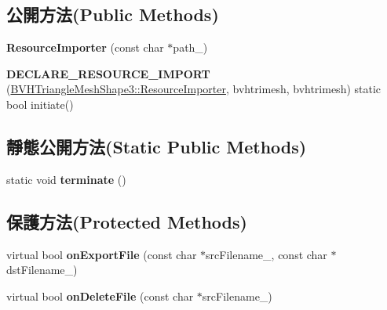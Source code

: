 \subsection*{公開方法(Public Methods)}
\begin{DoxyCompactItemize}
\item 
{\bfseries Resource\+Importer} (const char $\ast$path\+\_\+)\hypertarget{class_magnum_1_1_b_v_h_triangle_mesh_shape3_1_1_resource_importer_a3ae29654117886906c28c8e8b51dbdd3}{}\label{class_magnum_1_1_b_v_h_triangle_mesh_shape3_1_1_resource_importer_a3ae29654117886906c28c8e8b51dbdd3}

\item 
{\bfseries D\+E\+C\+L\+A\+R\+E\+\_\+\+R\+E\+S\+O\+U\+R\+C\+E\+\_\+\+I\+M\+P\+O\+RT} (\hyperlink{class_magnum_1_1_b_v_h_triangle_mesh_shape3_1_1_resource_importer}{B\+V\+H\+Triangle\+Mesh\+Shape3\+::\+Resource\+Importer}, bvhtrimesh, bvhtrimesh) static bool initiate()\hypertarget{class_magnum_1_1_b_v_h_triangle_mesh_shape3_1_1_resource_importer_ad634a04f8e8efbf2a76a53cf486888cf}{}\label{class_magnum_1_1_b_v_h_triangle_mesh_shape3_1_1_resource_importer_ad634a04f8e8efbf2a76a53cf486888cf}

\end{DoxyCompactItemize}
\subsection*{靜態公開方法(Static Public Methods)}
\begin{DoxyCompactItemize}
\item 
static void {\bfseries terminate} ()\hypertarget{class_magnum_1_1_b_v_h_triangle_mesh_shape3_1_1_resource_importer_a85dce0c92bd836ea55fb43491666913b}{}\label{class_magnum_1_1_b_v_h_triangle_mesh_shape3_1_1_resource_importer_a85dce0c92bd836ea55fb43491666913b}

\end{DoxyCompactItemize}
\subsection*{保護方法(Protected Methods)}
\begin{DoxyCompactItemize}
\item 
virtual bool {\bfseries on\+Export\+File} (const char $\ast$src\+Filename\+\_\+, const char $\ast$dst\+Filename\+\_\+)\hypertarget{class_magnum_1_1_b_v_h_triangle_mesh_shape3_1_1_resource_importer_a208b0ca1d78cce5fe81a7e20d1303065}{}\label{class_magnum_1_1_b_v_h_triangle_mesh_shape3_1_1_resource_importer_a208b0ca1d78cce5fe81a7e20d1303065}

\item 
virtual bool {\bfseries on\+Delete\+File} (const char $\ast$src\+Filename\+\_\+)\hypertarget{class_magnum_1_1_b_v_h_triangle_mesh_shape3_1_1_resource_importer_a6ecf7347fc634e9ab42a8276a9d6ab4b}{}\label{class_magnum_1_1_b_v_h_triangle_mesh_shape3_1_1_resource_importer_a6ecf7347fc634e9ab42a8276a9d6ab4b}

\end{DoxyCompactItemize}
